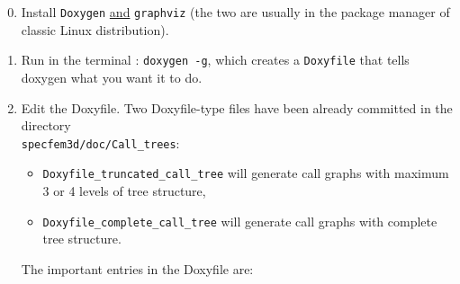 \begin{enumerate}
\setcounter{enumi}{-1}
\item Install \texttt{Doxygen} \underline{and} \texttt{graphviz} (the two are usually in the package manager of classic Linux distribution).
\item Run in the terminal : \texttt{doxygen -g}, which creates a \texttt{Doxyfile} that tells doxygen what you want it to do.
\item Edit the Doxyfile. Two Doxyfile-type files have been already committed in the directory \\
\noindent \texttt{specfem3d/doc/Call\_trees}:

\begin{itemize}
\item[\textbullet] \texttt{Doxyfile\_truncated\_call\_tree} will generate call graphs with maximum 3 or 4 levels of tree structure,
\item[\textbullet] \texttt{Doxyfile\_complete\_call\_tree} will generate call graphs with complete tree structure.
\end{itemize}

The important entries in the Doxyfile are:


\end{enumerate}
